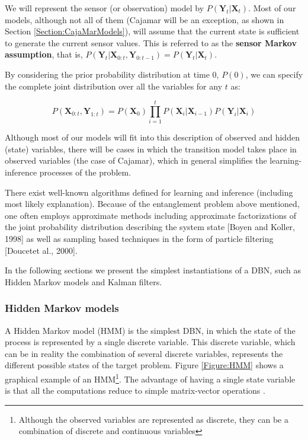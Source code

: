 We will represent the sensor (or observation) model by $P(\bm Y_t|\bm X_t)$. Most of our models, although not all of them (Cajamar will be an exception, as shown in Section \ref{Section:CajaMarModels}), will assume that the current state is sufficient to generate the current sensor values. This is referred to as the \textbf{sensor Markov assumption}, that is, $P(\bm Y_t|\bm X_{0:t}, \bm Y_{0:t-1}) = P(\bm Y_t|\bm X_t)$.

By considering the prior probability distribution at time $0$, $P(0)$, we can specify the complete joint distribution over all the variables for any $t$ as:

\begin{equation}
P(\bm X_{0:t},\bm Y_{1:t}) = P(\bm X_0) \prod_{i=1}^t{P(\bm X_i| \bm X_{i-1})P(\bm Y_i|\bm X_i)}
\end{equation}

Although most of our models will fit into this description of observed and hidden (state) variables, there will be cases in which the transition model takes place in observed variables (the case of Cajamar), which in general simplifies the learning-inference processes of the problem.

There exist well-known algorithms defined for learning and inference (including most likely explanation). Because of the entanglement problem above mentioned, one often employs approximate methods including approximate factorizations of the joint probability distribution describing the system state [Boyen and Koller, 1998] as well as sampling based techniques in the form of particle filtering [Doucetet al., 2000].

In the following sections we present the simplest instantiations of a DBN, such as Hidden Markov models and Kalman filters.

\subsubsection*{Hidden Markov models}
A Hidden Markov model (HMM) is the simplest DBN, in which the state of the process is represented by a single discrete variable. This discrete variable, which can be in reality the combination of several discrete variables, represents the different possible states of the target problem. Figure \ref{Figure:HMM} shows a graphical example of an HMM\footnote{Although the observed variables are represented as discrete, they can be a combination of discrete and continuous variables}. The advantage of having a single state variable is that all the computations reduce to simple matrix-vector operations .

